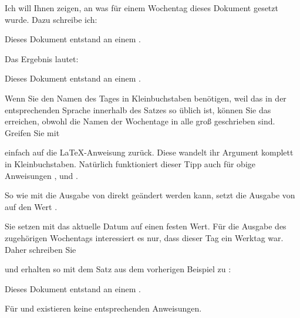 \begin{Example}
  Ich will Ihnen zeigen, an was für einem Wochentag dieses Dokument gesetzt
  wurde. Dazu schreibe ich:
\begin{lstcode}
  Dieses Dokument entstand an einem \todaysname.
\end{lstcode}
  Das Ergebnis lautet:
  \begin{ShowOutput}
  Dieses Dokument entstand an einem \todaysname.
  \end{ShowOutput}
\end{Example}

\begin{Explain}
  Wenn Sie den Namen des Tages in Kleinbuchstaben benötigen,
  weil das in der entsprechenden Sprache innerhalb des Satzes so üblich ist,
  können Sie das erreichen, obwohl die Namen der Wochentage in
   alle groß geschrieben sind. Greifen Sie mit
\begin{lstcode}
  \MakeLowercase{\todaysname}
\end{lstcode}
  einfach auf die \LaTeX-Anweisung
   zurück. Diese wandelt ihr Argument
  komplett in Kleinbuchstaben. Natürlich funktioniert dieser Tipp auch für
  obige Anweisungen
  ,
   und
  .%
\end{Explain}%
\EndIndexGroup


\begin{Declaration}
\end{Declaration}%
So wie mit  die Ausgabe von
 direkt geändert werden kann, setzt  die Ausgabe
von  auf den Wert .
\begin{Example}
  Sie setzen mit  das aktuelle Datum auf einen
  festen Wert. Für die Ausgabe des zugehörigen Wochentags interessiert es nur,
  dass dieser Tag ein Werktag war. Daher schreiben Sie
\begin{lstcode}
\end{lstcode}
  und erhalten so mit dem Satz aus dem vorherigen Beispiel zu
  :
  \begin{ShowOutput}
    Dieses Dokument entstand an einem {\todaysname}.
  \end{ShowOutput}
\end{Example}
Für  und
 existieren keine
entsprechenden Anweisungen.%
\EndIndexGroup


